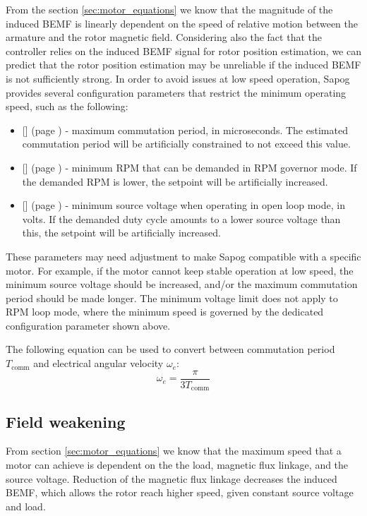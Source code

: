 \documentclass{zubaxdoc}
\newcommand{\CfgRef}[1]{
    \StrSubstitute{#1}{+}{\textunderscore}[\temp]
    \texttt{\temp} {\footnotesize (page \pageref{#1})}
}
\begin{document}
From the section \ref{sec:motor_equations} we know that the magnitude of the induced BEMF is linearly
dependent on the speed of relative motion between the armature and the rotor magnetic field.
Considering also the fact that the controller relies on the induced BEMF signal for rotor position estimation,
we can predict that the rotor position estimation may be unreliable if the induced BEMF is not sufficiently
strong.
In order to avoid issues at low speed operation, Sapog provides several configuration parameters that
restrict the minimum operating speed, such as the following:

\begin{itemize}
\item \CfgRef{mot+comm+per+max} - maximum commutation period, in microseconds.
The estimated commutation period will be artificially constrained to not exceed this value.
\item \CfgRef{mot+rpm+min} - minimum RPM that can be demanded in RPM governor mode.
If the demanded RPM is lower, the setpoint will be artificially increased.
\item \CfgRef{mot+v+min} - minimum source voltage when operating in open loop mode, in volts.
If the demanded duty cycle amounts to a lower source voltage than this, the setpoint will be artificially
increased.
\end{itemize}

These parameters may need adjustment to make Sapog compatible with a specific motor.
For example, if the motor cannot keep stable operation at low speed,
the minimum source voltage should be increased,
and/or the maximum commutation period should be made longer.
The minimum voltage limit does not apply to RPM loop mode,
where the minimum speed is governed by the dedicated configuration parameter shown above.

The following equation can be used to convert between commutation period $T_\text{comm}$
and electrical angular velocity $\omega_e$:
\begin{equation}
\omega_e = \frac{\pi}{3 T_\text{comm}}
\end{equation}

\subsection{Field weakening}

From section \ref{sec:motor_equations} we know that the maximum speed that a motor can achieve is dependent
on the the load, magnetic flux linkage, and the source voltage.
Reduction of the magnetic flux linkage decreases the induced BEMF, which allows the rotor reach higher speed,
given constant source voltage and load.
\end{document}
